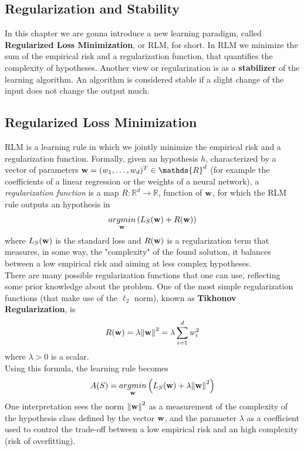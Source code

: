 \documentclass[12pt]{report}
\theoremstyle{plain}
\begin{document}
\begin{flushleft}
\chapter{Regularization and Stability}

In this chapter we are gonna introduce a new learning paradigm, called 
\textbf{Regularized Loss Minimization}, or RLM, for short. In RLM we minimize 
the sum of the empirical risk and a regularization function, that quantifies 
the complexity of hypotheses. Another view or regularization is as a 
\textbf{stabilizer} of the learning algorithm. An algorithm is considered 
stable if a slight change of the input does not change the output much.

\section{Regularized Loss Minimization}
RLM is a learning rule in which we jointly minimize the empirical risk and a 
regularization function. Formally, given an hypothesis $h$, characterized by a 
vector of parameters $\vb{w}=(w_1,\dots,w_d)^T\in\mathds{R}^d$ (for example the 
coefficients of a linear regression or the weights of a neural network), a 
\textit{regularization function} is a map $R:\mathds{R}^d\to\mathds{R}$, 
function of $\vb{w}$, for which the RLM rule outputs an hypothesis in 
\begin{equation}
	\underset{\vb{w}}{argmin}\left(L_S(\vb{w})+R(\vb{w})\right) 
	\label{eq:RLM}
\end{equation}
where $L_S(\vb{w})$ is the standard loss and $R(\vb{w})$ is a regularization 
term that measures, in some way, the "complexity" of the found solution, it 
balances between a low empirical risk and aiming at less complex hypotheses.\\
There are many possible regularization functions that one can use, reflecting 
some prior knowledge about the problem. One of the most simple regularization 
functions (that make use of the $\ell_2$ norm), known as \textbf{Tikhonov 
Regularization}, is
\[ R(\vb{w})=\lambda\norm{\vb{w}}^2=\lambda\sum_{i=1}^d w_i^2 \]
where $\lambda>0$ is a scalar.\\
Using this formula, the learning rule becomes
\[ 
A(S)=\underset{\vb{w}}{argmin}\left(L_S(\vb{w})+\lambda\norm{\vb{w}}^2\right) \]
One interpretation sees the norm $\norm{\vb{w}}^2$ as a measurement of the 
complexity of the hypothesis class defined by the vector $\vb{w}$, and the 
parameter $\lambda$ as a coefficient used to control the trade-off between a 
low empirical risk and an high complexity (risk of overfitting).


\end{flushleft}
\end{document}
